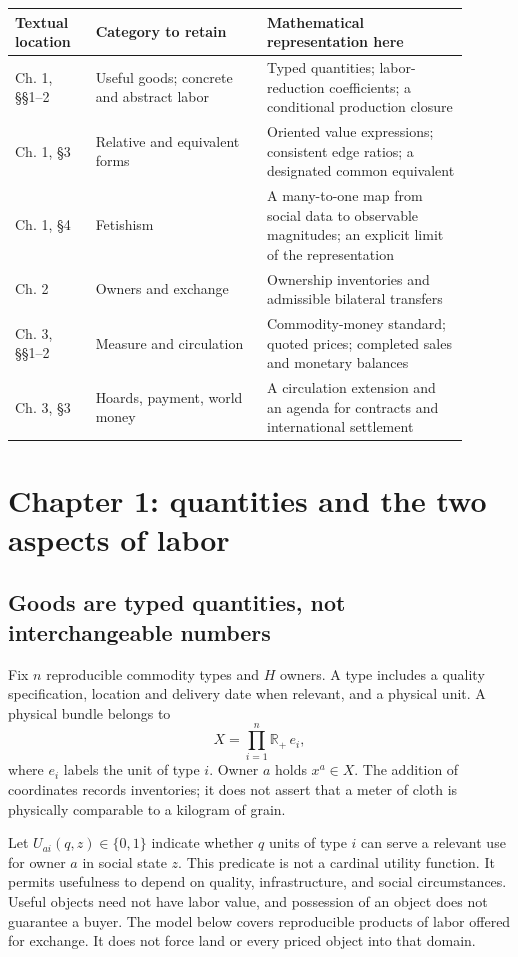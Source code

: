 \documentclass[11pt,letterpaper]{article}
\newcommand{\R}{\mathbb R}
\begin{document}
\begin{center}
\small
\begin{tabular}{p{0.16\linewidth}p{0.34\linewidth}p{0.40\linewidth}}
\toprule
Textual location & Category to retain & Mathematical representation here\\
\midrule
Ch. 1, §§1--2 & Useful goods; concrete and abstract labor & Typed quantities;
labor-reduction coefficients; a conditional production closure\\
Ch. 1, §3 & Relative and equivalent forms & Oriented value expressions;
consistent edge ratios; a designated common equivalent\\
Ch. 1, §4 & Fetishism & A many-to-one map from social data to observable
magnitudes; an explicit limit of the representation\\
Ch. 2 & Owners and exchange & Ownership inventories and admissible
bilateral transfers\\
Ch. 3, §§1--2 & Measure and circulation & Commodity-money standard;
quoted prices; completed sales and monetary balances\\
Ch. 3, §3 & Hoards, payment, world money & A circulation extension and
an agenda for contracts and international settlement\\
\bottomrule
\end{tabular}
\end{center}

\section{Chapter 1: quantities and the two aspects of labor}
\subsection{Goods are typed quantities, not interchangeable numbers}
Fix $n$ reproducible commodity types and $H$ owners. A type includes a
quality specification, location and delivery date when relevant, and a
physical unit. A physical bundle belongs to
\[
 X=\prod_{i=1}^n\R_+\,e_i,
\]
where $e_i$ labels the unit of type $i$. Owner $a$ holds $x^a\in X$.
The addition of coordinates records inventories; it does not assert that
a meter of cloth is physically comparable to a kilogram of grain.

Let $U_{ai}(q,z)\in\{0,1\}$ indicate whether $q$ units of type $i$ can
serve a relevant use for owner $a$ in social state $z$. This predicate is
not a cardinal utility function. It permits usefulness to depend on
quality, infrastructure, and social circumstances. Useful objects need
not have labor value, and possession of an object does not guarantee a
buyer. The model below covers reproducible products of labor offered for
exchange. It does not force land or every priced object into that domain.
\end{document}
